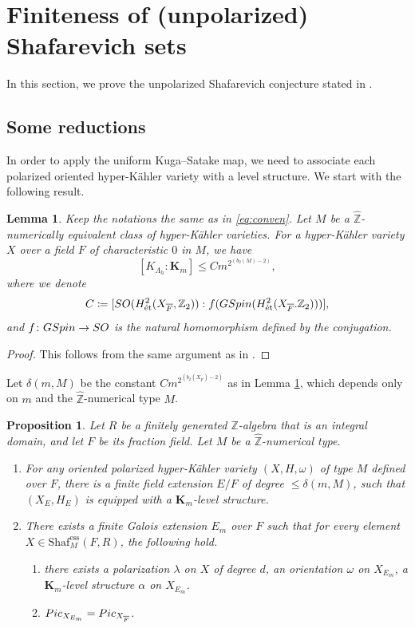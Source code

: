 \documentclass[11pt,reqno,oneside]{amsart}
\numberwithin{equation}{section}
\newtheorem{proposition}[theorem]{Proposition}
\newtheorem{lemma}[theorem]{Lemma}
\theoremstyle{definition}
\DeclareMathOperator{\ess}{ess}
\newcommand{\Pic}{{\rm Pic}}
\newcommand{\SO}{{\rm SO}}
\newcommand{\GSpin}{{\rm GSpin}}
\DeclareMathOperator{\et}{\Acute{e}t}
\newcommand{\Sha}{\mathrm{Shaf}}
\newcommand{\ZZ}{\mathbb{Z}}
\begin{document}
\section{Finiteness of (unpolarized) Shafarevich sets} 
\label{sec:FinitnessResults}
In this section, we prove the unpolarized Shafarevich conjecture stated in .

\subsection{Some reductions}In order to apply the uniform Kuga--Satake map, we need to associate each polarized oriented hyper-Kähler variety with a level structure. We start with the following result. 



\begin{lemma}Keep the notations the same as in \eqref{eq:conven}. Let $M$ be a $\widehat{\ZZ}$-numerically equivalent class of hyper-Kähler varieties. For a hyper-Kähler variety $X$ over a field $F$ of characteristic $0$ in $M$, we have
\[
[K_{\Lambda_h}: \mathbf{K}_m] \leq C m^{2^{(b_{2}(M)-2)}},
\]
where we denote
\[
C\coloneqq [\SO(H^{2}_{\et} (X_{\overline{F}},\ZZ_{2})): f (\GSpin (H^{2}_{\et} (X_{\overline{F}}. \ZZ_{2})))],
\]
and $f\colon \GSpin \rightarrow \SO$ is the natural homomorphism defined by the conjugation.
\label{lemlevel}
\end{lemma}
\begin{proof}
This follows from the same argument as in \cite[Corollary 3.1.8]{Takamatsu2020K3}.
\end{proof}

Let $\delta(m,M)$ be the constant $C m^{2^{(b_{2}(X_{\overline{F}})-2)}}$ as in Lemma \ref{lemlevel}, which depends only on $m$ and the $\widehat{\ZZ}$-numerical type $M$.

\begin{proposition}
\label{unplevel}
Let $R$ be a finitely generated $\ZZ$-algebra that is an integral domain, and let $F$ be its fraction field. Let $M$ be a $\widehat{\ZZ}$-numerical type.
\begin{enumerate}
    \item[(i)] For any oriented polarized hyper-Kähler variety $(X,H,\omega)$ of type $M$ defined over $F$, there is a finite field extension $E/F$ of degree $\leq \delta(m,M)$, such that $(X_E,H_E)$ is equipped with a $\mathbf{K}_m$-level structure.
    \item[(ii)] There exists a finite Galois extension $E_m$ over $F$ such that for every element $X \in \Sha_{M}^{\ess}(F,R)$, the following hold.
\begin{enumerate}
\item
there exists a polarization $\lambda$ on $X$ of degree $d$, an orientation $\omega$ on $X_{E_m}$, a $\mathbf{K}_m$-level structure $\alpha$ on $X_{E_m}$.
\item
$\Pic_{X_{E_m}} = \Pic_{X_{\overline{F}}}$.
\end{enumerate}
\end{enumerate}
\end{proposition}
\end{document}
